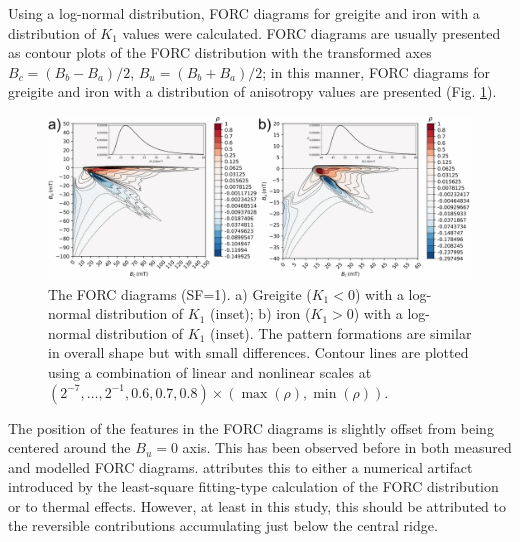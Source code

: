 Using a log-normal distribution, FORC diagrams for greigite and iron with a distribution of $K_1$ values were calculated. FORC diagrams are usually presented as contour plots of the FORC distribution with the transformed axes $B_c = (B_b - B_a)/2$, $B_u = (B_b + B_a)/2$; in this manner, FORC diagrams for greigite and iron with a distribution of anisotropy values are presented (Fig. \ref{FIG_E04}).
\begin{figure}
\includegraphics[width=\textwidth]{research-2/figs/rePLOT_FIG04.pdf}
\caption[FORC diagrams (dipolar model)]{The FORC diagrams (SF=1). a) Greigite ($K_1 < 0$) with a log-normal distribution of $K_1$ (inset); b) iron ($K_1 > 0$) with a log-normal distribution of $K_1$ (inset). The pattern formations are similar in overall shape but with small differences. Contour lines are plotted using a combination of linear and nonlinear scales at $(2^{-7},\ldots, 2^{-1},0.6, 0.7, 0.8)\times (\max (\rho), \min (\rho))$.}
\label{FIG_E04}
\end{figure}
\par
The position of the features in the FORC diagrams is slightly offset from being centered around the $B_u=0$ axis. This has been observed before in both measured and modelled FORC diagrams. \citet{Newell2005} attributes this to either a numerical artifact introduced by the least-square fitting-type calculation of the FORC distribution or to thermal effects. However, at least in this study, this should be attributed to the reversible contributions accumulating just below the central ridge.\par

